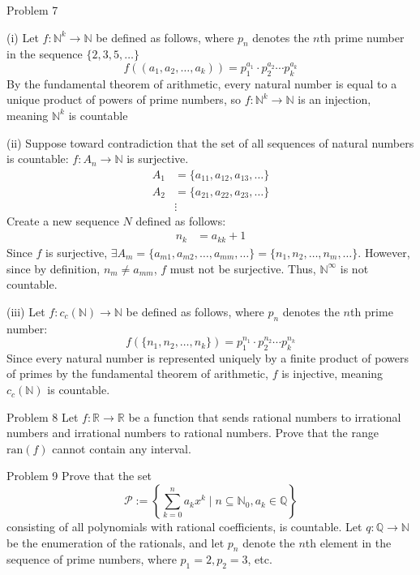 \documentclass[10pt]{extarticle}
\begin{document}
{\begin{problem}{Problem 7}
\begin{problem}{(i)}
      Let $f: \mathbb{N}^k \rightarrow \mathbb{N}$ be defined as follows, where $p_n$ denotes the $n$th prime number in the sequence $\{2,3,5,\dots\}$
      \[
        f((a_1,a_2,\dots,a_k)) = p_1^{a_1}\cdot p_2^{a_2}\cdots p_k^{a_k}
      \] 
      By the fundamental theorem of arithmetic, every natural number is equal to a unique product of powers of prime numbers, so $f: \mathbb{N}^k \rightarrow \mathbb{N}$ is an injection, meaning $\mathbb{N}^k$ is countable
    \end{problem}
    \begin{problem}{(ii)}
      Suppose toward contradiction that the set of all sequences of natural numbers is countable: $f:A_n \rightarrow \mathbb{N}$ is surjective.
      \begin{align*}
        A_1 &= \{a_{11},a_{12},a_{13},\dots\}\\
        A_2 &= \{a_{21},a_{22},a_{23},\dots\}\\
            &\vdots
      \end{align*}
      Create a new sequence $N$ defined as follows:
      \begin{align*}
        n_{k} &= a_{kk} + 1
      \end{align*}
      Since $f$ is surjective, $\exists A_m = \{a_{m1},a_{m2},\dots,a_{mm},\dots\} = \{n_{1},n_{2},\dots,n_{m},\dots\}$. However, since by definition, $n_m \neq a_{mm}$, $f$ must not be surjective. Thus, $\mathbb{N}^{\infty}$ is not countable.
    \end{problem}
    \begin{problem}{(iii)}
      Let $f: c_c(\mathbb{N}) \rightarrow \mathbb{N}$ be defined as follows, where $p_n$ denotes the $n$th prime number:
      \[
        f(\{n_1,n_2,\dots,n_k\}) = p_1^{n_1}\cdot p_2^{n_2}\cdots p_{k}^{n_k}
      \] 
      Since every natural number is represented uniquely by a finite product of powers of primes by the fundamental theorem of arithmetic, $f$ is injective, meaning $c_c(\mathbb{N})$ is countable.
    \end{problem}
  \end{problem}
  \begin{problem}{Problem 8}
    Let $f:\mathbb{R} \rightarrow \mathbb{R}$ be a function that sends rational numbers to irrational numbers and irrational numbers to rational numbers. Prove that the range $\textrm{ran}(f)$ cannot contain any interval.
  \end{problem}
  \begin{problem}{Problem 9}
    Prove that the set
    \[
      \mathcal{P} := \left\{\sum_{k=0}^{n}a_kx^k \mid n\subseteq \mathbb{N}_0,a_k\in\mathbb{Q}\right\}
    \] 
    consisting of all polynomials with rational coefficients, is countable.
    \tcblower
    Let $q: \mathbb{Q} \rightarrow \mathbb{N}$ be the enumeration of the rationals, and let $p_n$ denote the $n$th element in the sequence of prime numbers, where $p_1 = 2, p_2 = 3$, etc.\\


\end{problem}}
\end{document}
